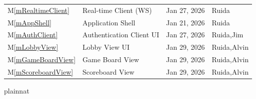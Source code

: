 \documentclass[12pt, titlepage]{article}
\newcommand{\mref}[1]{M\ref{#1}}
\begin{document}
\begin{table}[H]
\begin{tabularx}{\textwidth}{p{1.5cm} p{5.5cm} p{3cm} X}
\midrule
\mref{mRealtimeClient} & Real-time Client (WS) & Jan 27, 2026 & Ruida \\
\mref{mAppShell} & Application Shell & Jan 21, 2026 & Ruida \\
\mref{mAuthClient} & Authentication Client UI & Jan 27, 2026 & Ruida,Jim \\
\mref{mLobbyView} & Lobby View UI & Jan 29, 2026 & Ruida,Alvin \\
\mref{mGameBoardView} & Game Board View &  Jan 29, 2026 & Ruida,Alvin \\
\mref{mScoreboardView} & Scoreboard View &  Jan 29, 2026 & Ruida,Alvin \\
\bottomrule
\end{tabularx}
\end{table}


\newpage

 {plainnat}

\end{document}
